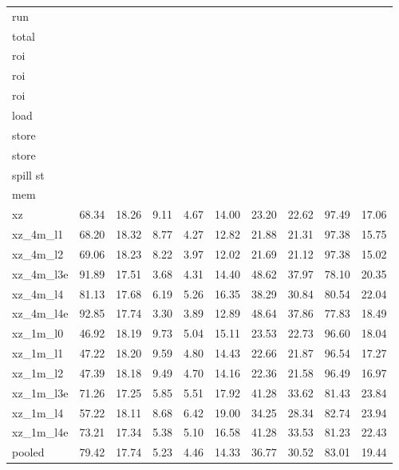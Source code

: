 \documentclass[10pt,a4paper]{article}
\begin{document}
{\begin{longtable}{@{}lrrrrrrrrr@{}}
run & \begin{tabular}[b]{@{}c@{}}roi/\\total\end{tabular} & \begin{tabular}[b]{@{}c@{}}load/\\roi\end{tabular} & \begin{tabular}[b]{@{}c@{}}store/\\roi\end{tabular} & \begin{tabular}[b]{@{}c@{}}spill/\\roi\end{tabular} & \begin{tabular}[b]{@{}c@{}}spill ld/\\load\end{tabular} & \begin{tabular}[b]{@{}c@{}}spill st/\\store\end{tabular} & \begin{tabular}[b]{@{}c@{}}spill ev/\\store\end{tabular} & \begin{tabular}[b]{@{}c@{}}spill ev/\\spill st\end{tabular} & \begin{tabular}[b]{@{}c@{}}spill/\\mem\end{tabular} \\
\midrule
\endhead
\bottomrule
\endlastfoot
xz & 68.34 & 18.26 & 9.11 & 4.67 & 14.00 & 23.20 & 22.62 & 97.49 & 17.06 \\
xz\_4m\_l1 & 68.20 & 18.32 & 8.77 & 4.27 & 12.82 & 21.88 & 21.31 & 97.38 & 15.75 \\
xz\_4m\_l2 & 69.06 & 18.23 & 8.22 & 3.97 & 12.02 & 21.69 & 21.12 & 97.38 & 15.02 \\
xz\_4m\_l3e & 91.89 & 17.51 & 3.68 & 4.31 & 14.40 & 48.62 & 37.97 & 78.10 & 20.35 \\
xz\_4m\_l4 & 81.13 & 17.68 & 6.19 & 5.26 & 16.35 & 38.29 & 30.84 & 80.54 & 22.04 \\
xz\_4m\_l4e & 92.85 & 17.74 & 3.30 & 3.89 & 12.89 & 48.64 & 37.86 & 77.83 & 18.49 \\
xz\_1m\_l0 & 46.92 & 18.19 & 9.73 & 5.04 & 15.11 & 23.53 & 22.73 & 96.60 & 18.04 \\
xz\_1m\_l1 & 47.22 & 18.20 & 9.59 & 4.80 & 14.43 & 22.66 & 21.87 & 96.54 & 17.27 \\
xz\_1m\_l2 & 47.39 & 18.18 & 9.49 & 4.70 & 14.16 & 22.36 & 21.58 & 96.49 & 16.97 \\
xz\_1m\_l3e & 71.26 & 17.25 & 5.85 & 5.51 & 17.92 & 41.28 & 33.62 & 81.43 & 23.84 \\
xz\_1m\_l4 & 57.22 & 18.11 & 8.68 & 6.42 & 19.00 & 34.25 & 28.34 & 82.74 & 23.94 \\
xz\_1m\_l4e & 73.21 & 17.34 & 5.38 & 5.10 & 16.58 & 41.28 & 33.53 & 81.23 & 22.43 \\
\midrule
pooled & 79.42 & 17.74 & 5.23 & 4.46 & 14.33 & 36.77 & 30.52 & 83.01 & 19.44 \\
\end{longtable}
}
\end{document}
